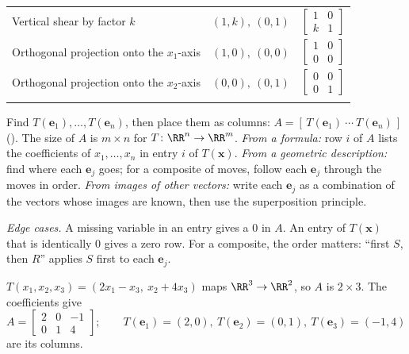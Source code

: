 \documentclass[10pt]{scrartcl}
\newcommand{\vv}[1]{\mathbf{#1}}
\begin{document}
\begin{center}
\begin{tabular}{@{}lcc@{}}
Vertical shear by factor $k$ & $(1,k),\ (0,1)$ & $\begin{bmatrix}1&0\\k&1\end{bmatrix}$ \\\addlinespace[7pt]
Orthogonal projection onto the $x_1$-axis & $(1,0),\ (0,0)$ & $\begin{bmatrix}1&0\\0&0\end{bmatrix}$ \\\addlinespace[7pt]
Orthogonal projection onto the $x_2$-axis & $(0,0),\ (0,1)$ & $\begin{bmatrix}0&0\\0&1\end{bmatrix}$ \\\addlinespace[4pt]
\bottomrule
\end{tabular}
\end{center}

\begin{steps}
  \ii Find $T(\vv e_1),\dots,T(\vv e_n)$, then place them as columns: $A=[\,T(\vv e_1)\ \cdots\ T(\vv e_n)\,]$ (). The size of $A$ is $m\times n$ for $T\colon\RR^n\to\RR^m$.
  \ii \emph{From a formula:} row $i$ of $A$ lists the coefficients of $x_1,\dots,x_n$ in entry $i$ of $T(\vv x)$.
  \ii \emph{From a geometric description:} find where each $\vv e_j$ goes; for a composite of moves, follow each $\vv e_j$ through the moves in order.
  \ii \emph{From images of other vectors:} write each $\vv e_j$ as a combination of the vectors whose images are known, then use the superposition principle.
\end{steps}
\emph{Edge cases.} A missing variable in an entry gives a $0$ in $A$. An entry of $T(\vv x)$ that is identically $0$ gives a zero row. For a composite, the order matters: ``first $S$, then $R$'' applies $S$ first to each $\vv e_j$.

\begin{example*}
$T(x_1,x_2,x_3)=(2x_1-x_3,\ x_2+4x_3)$ maps $\RR^3\to\RR^2$, so $A$ is $2\times3$. The coefficients give
\[
  A=\begin{bmatrix}2&0&-1\\0&1&4\end{bmatrix};\qquad
  T(\vv e_1)=(2,0),\ T(\vv e_2)=(0,1),\ T(\vv e_3)=(-1,4)
\]
are its columns.
\end{example*}
\end{document}
